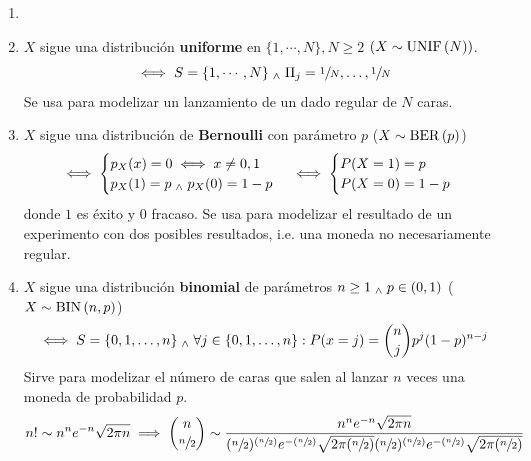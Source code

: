 \begin{ejem}
	\begin{enumerate}
		\item []
		\item $X$ sigue una distribución \textbf{uniforme} en $\{1, \cdots, N\}, N\geq2$ $(X\sim\operatorname{UNIF}\left(N\right))$.
		      \[\iff S=\{1, \cdots, N\} \; _{\wedge} \; {\Pi_j}={\sfrac{1}{N}, \dots, \sfrac{1}{N}}\]
		      Se usa para modelizar un lanzamiento de un dado regular de $N$ caras.
		\item $X$ sigue una distribución de \textbf{Bernoulli} con parámetro $p$ ($X\sim\operatorname{BER}\left(p\right)$)
		      \[\iff \begin{cases}
				      p_X(x)=0 \iff x\ne 0, 1 \\
				      p_X(1)=p \; _{\wedge} \; p_X(0)=1-p
			      \end{cases}\iff\begin{cases}
				      P(X=1)=p \\
				      P(X=0)=1-p
			      \end{cases}\]
		      donde $1$ es éxito y $0$ fracaso. Se usa para modelizar el resultado de un
		      experimento con dos posibles resultados, i.e. una moneda no necesariamente
		      regular.
		\item $X$ sigue una distribución \textbf{binomial} de parámetros $n\geq 1 \; _{\wedge} \; p\in (0, 1)$ ($X\sim\operatorname{BIN}\left(n, p\right)$)
		      \[\iff S=\{0, 1, \dots, n\} \; _{\wedge} \; \forall j\in \{0, 1, \dots, n\}:P(x=j)=\binom{n}{j}p^j(1-p)^{n-j}\]
		      Sirve para modelizar el número de caras que salen al lanzar $n$ veces una
		      moneda de probabilidad $p$.
		      \[n! \sim n^ne^{-n}\sqrt{2\pi n}\implies \binom{n}{\sfrac{n}{2}}\sim\frac{n^ne^{-n}\sqrt{2\pi n}}{(\sfrac{n}        {2})^{(\sfrac{n}{2})}e^{-(\sfrac{n}{2})}\sqrt{2\pi (\sfrac{n}{2})}(\sfrac{n}{2})^{(\sfrac{n}{2})}e^{-(\sfrac{n}     {2})}\sqrt{2\pi (\sfrac{n}{2})}}\]


\end{enumerate}
\end{ejem}
